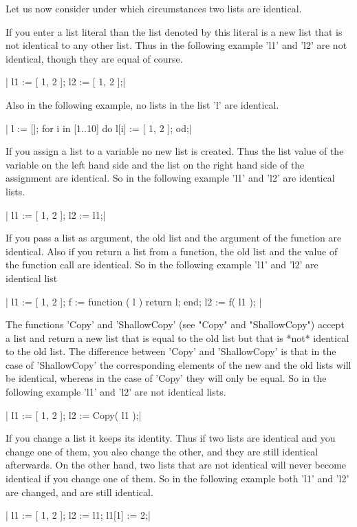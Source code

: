 Let us now consider under which circumstances two lists are identical.

If  you enter a list  literal than the list  denoted by this literal is a
new list that is not identical  to any other list.  Thus in the following
example 'l1' and 'l2' are not identical, though they are equal of course.

|    l1 := [ 1, 2 ];
    l2 := [ 1, 2 ];|

Also in the following example, no lists in the list 'l' are identical.

|    l := [];
    for i  in [1..10]  do l[i] := [ 1, 2 ];  od;|

If you assign a list to a variable no new list is created.  Thus the list
value of  the variable on  the left hand side  and the  list on the right
hand side of the assignment  are identical.  So in  the following example
'l1' and 'l2' are identical lists.

|    l1 := [ 1, 2 ];
    l2 := l1;|

If you pass  a  list as argument, the  old  list and the argument  of the
function are identical.  Also if  you return a list from a  function, the
old list  and the  value of  the function call are  identical.  So in the
following example 'l1' and 'l2' are identical list

|    l1 := [ 1, 2 ];
    f := function ( l )  return l;  end;
    l2 := f( l1 ); |

The functions 'Copy'  and  'ShallowCopy' (see "Copy"  and  "ShallowCopy")
accept  a list and return a  new list that  is equal to the  old list but
that is *not*  identical to the old list.  The  difference between 'Copy'
and 'ShallowCopy' is that  in the case of 'ShallowCopy' the corresponding
elements of the new and the old lists  will be  identical, whereas in the
case of 'Copy' they will only be equal.  So in the following example 'l1'
and 'l2' are not identical lists.

|    l1 := [ 1, 2 ];
    l2 := Copy( l1 );|

If  you change a list  it  keeps its  identity.   Thus if  two  lists are
identical and you change one of them, you also change the other, and they
are still identical  afterwards.  On  the other hand, two lists that  are
not identical will never become  identical if you change one of them.  So
in  the following example both 'l1' and 'l2'  are changed,  and are still
identical.

|    l1 := [ 1, 2 ];
    l2 := l1;
    l1[1] := 2;|

